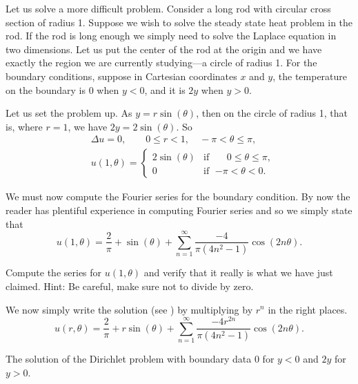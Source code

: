 \begin{example}
Let us solve a more difficult problem.  Consider a long
rod with circular cross section of radius 1.  Suppose we wish to solve the
steady state heat problem in the rod.
If the rod is long enough we simply need to solve
the Laplace equation in two dimensions.  Let us put the center of the rod at
the origin and we have exactly the region we are currently
studying---a circle of radius 1.  For the boundary conditions, suppose in
Cartesian coordinates $x$ and
$y$, the temperature on the boundary is 0 when $y < 0$, and it is $2y$ when $y > 0$.

Let us set the problem up.
As $y = r\sin(\theta)$, then on the
circle of radius 1, that is, where $r=1$, we have $2y = 2\sin(\theta)$.  So
\begin{align*}
& \Delta u = 0 , \qquad 0 \leq r < 1, \quad -\pi < \theta \leq \pi,\\
& u(1,\theta) = 
\begin{cases}
2\sin(\theta) & \text{if } \; \phantom{-}0 \leq \theta \leq \pi, \\
0 & \text{if } \; {-\pi} < \theta < 0.
\end{cases}
\end{align*}

We must now compute the Fourier series for the boundary
condition.  By now the reader has plentiful experience in computing
Fourier series and so we simply state that 
\begin{equation*}
u(1,\theta) = 
\frac{2}{\pi}
+
\sin(\theta)
+
\sum_{n=1}^\infty \frac{-4}{\pi(4n^2-1)} \cos(2n\theta) .
\end{equation*}

\begin{exercise}
Compute the series for $u(1,\theta)$ and verify that it really is what
we have just claimed.  Hint: Be careful, make sure not to divide by zero.
\end{exercise}

\pagebreak[2]
We now simply write the solution (see ) by multiplying by $r^n$ in the right places.
\begin{equation*}
u(r,\theta) = 
\frac{2}{\pi}
+
r\sin(\theta)
+
\sum_{n=1}^\infty \frac{-4r^{2n}}{\pi(4n^2-1)} \cos(2n\theta) .
\end{equation*}
\begin{myfig}
\capstart
{}
\caption{The solution of the Dirichlet problem with
boundary data 0 for $y < 0$ and $2y$ for $y > 0$.\label{dirichdisc:zero2yfig}}
\end{myfig}
\end{example}

